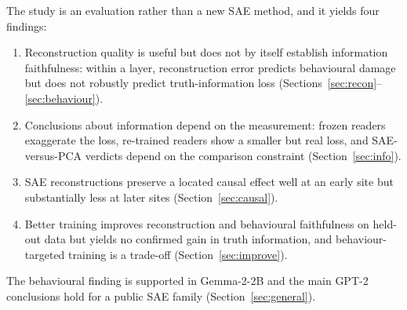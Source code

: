 The study is an evaluation rather than a new SAE method, and it yields four findings:
\begin{enumerate}
  \item Reconstruction quality is useful but does not by itself establish information faithfulness: within a layer,
        reconstruction error predicts behavioural damage but does not robustly predict truth-information loss
        (Sections~\ref{sec:recon}--\ref{sec:behaviour}).
  \item Conclusions about information depend on the measurement: frozen readers exaggerate the loss, re-trained readers
        show a smaller but real loss, and SAE-versus-PCA verdicts depend on the comparison constraint
        (Section~\ref{sec:info}).
  \item SAE reconstructions preserve a located causal effect well at an early site but substantially less at later
        sites (Section~\ref{sec:causal}).
  \item Better training improves reconstruction and behavioural faithfulness on held-out data but yields no confirmed
        gain in truth information, and behaviour-targeted training is a trade-off (Section~\ref{sec:improve}).
\end{enumerate}
The behavioural finding is supported in Gemma-2-2B and the main GPT-2 conclusions hold for a public SAE family
(Section~\ref{sec:general}).

